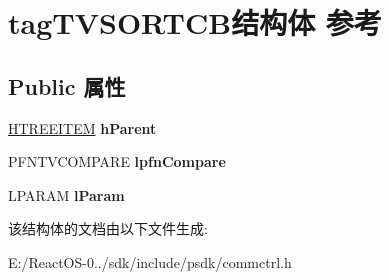 \hypertarget{structtag_t_v_s_o_r_t_c_b}{}\section{tag\+T\+V\+S\+O\+R\+T\+C\+B结构体 参考}
\label{structtag_t_v_s_o_r_t_c_b}
\subsection*{Public 属性}
\begin{DoxyCompactItemize}
\item 
\mbox{\label{structtag_t_v_s_o_r_t_c_b_a796182f29af574b7f2782ad595c4ef9b}} 
\hyperlink{struct___t_r_e_e_i_t_e_m}{H\+T\+R\+E\+E\+I\+T\+EM} {\bfseries h\+Parent}
\item 
\mbox{\label{structtag_t_v_s_o_r_t_c_b_a7c7607c4d3cde9390385fc08cfdff9b5}} 
P\+F\+N\+T\+V\+C\+O\+M\+P\+A\+RE {\bfseries lpfn\+Compare}
\item 
\mbox{\label{structtag_t_v_s_o_r_t_c_b_a2b38a4c4c896542066d435dcc1394002}} 
L\+P\+A\+R\+AM {\bfseries l\+Param}
\end{DoxyCompactItemize}


该结构体的文档由以下文件生成\+:\begin{DoxyCompactItemize}
\item 
E\+:/\+React\+O\+S-\/0../sdk/include/psdk/commctrl.\+h\end{DoxyCompactItemize}
